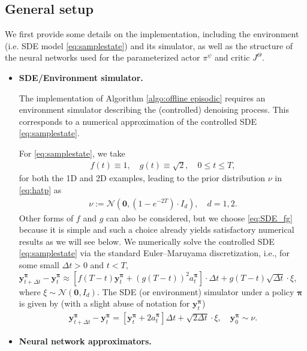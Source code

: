 \documentclass[11pt]{article}
\newcommand{\bpi}{\boldsymbol{\pi}}
\begin{document}
\subsection{General setup}\label{sec: 1d_sde_setup}
We first provide some details on the implementation, including the environment (i.e. SDE model \eqref{eq:samplestate}) and its simulator, as well as the structure of the neural networks used for the parameterized actor $\pi^\psi$ and critic $J^\Theta$.
\begin{itemize}
	\item \textbf{SDE/Environment simulator.}

	The implementation of Algorithm \ref{algo:offline episodic} requires an environment simulator describing the (controlled) denoising process. This corresponds to a numerical approximation of the controlled SDE \eqref{eq:samplestate}.

	For  \eqref{eq:samplestate}, we take
	\begin{align}\label{eq:SDE_fg}
		f(t)\equiv 1,\quad g(t)\equiv \sqrt{2},\quad 0\le t\le T,
	\end{align}
	for both the 1D and 2D examples, leading to the prior distribution $\nu$ in \eqref{eq:hatp} as
	\begin{align*}
		\nu:=\mathcal{N}\left(\mathbf{0}, \left(1 - e^{-2T}\right)\cdot I_d\right),\quad d=1, 2.
	\end{align*}
 Other forms of $f$ and $g$ can also be considered, but we choose \eqref{eq:SDE_fg} because it is simple and such a choice already yields satisfactory numerical results as we will see below.
	We numerically solve the controlled SDE \eqref{eq:samplestate} via the standard Euler--Maruyama discretization, i.e., for some small $\Delta t > 0$ and $t < T$, $\mathbf{y}^{\bpi}_{t + \Delta t} - \mathbf{y}^{\bpi}_{t} \approx \left[f(T- t) \mathbf{y}^{\bpi}_{t} +(g(T-t))^{2} a^{\bpi}_t \right] \cdot\Delta t + g(T-t)\sqrt{\Delta t} \cdot \xi$, where $\xi\sim \mathcal{N}(\mathbf{0}, I_d)$. The SDE (or environment) simulator under a policy $\bpi$ is given by (with a slight abuse of notation for $\mathbf{y}^{\bpi}_{t}$)
	\begin{align} \label{eq:simulator}
		\mathbf{y}^{\bpi}_{t + \Delta t} - \mathbf{y}^{\bpi}_{t}= \left[ \mathbf{y}^{\bpi}_{t} +2a^{\bpi}_t \right] \Delta t+ \sqrt{2\Delta t} \cdot \xi,  \quad \mathbf{y}^{\bpi}_{0} \sim \nu.
	\end{align}
	

	
	\item  \textbf{Neural network approximators.}
	


\end{itemize}
\end{document}
